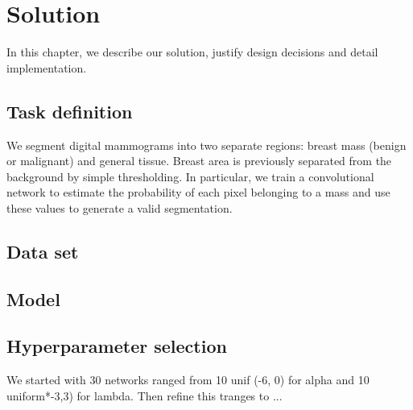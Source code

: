 \chapter{Solution}
\label{ch:Model}

In this chapter, we describe our solution, justify design decisions and detail implementation.



\section{Task definition}
We segment digital mammograms into two separate regions: breast mass (benign or malignant) and general tissue.
Breast area is previously separated from the background by simple thresholding.
In particular, we train a convolutional network to estimate the probability of each pixel belonging to a mass and use these values to generate a valid segmentation.


\section{Data set}


\section{Model}


\section{Hyperparameter selection}
We started with 30 networks ranged from 10 unif (-6, 0) for alpha and 10 uniform*-3,3) for lambda. Then refine this tranges to ...

